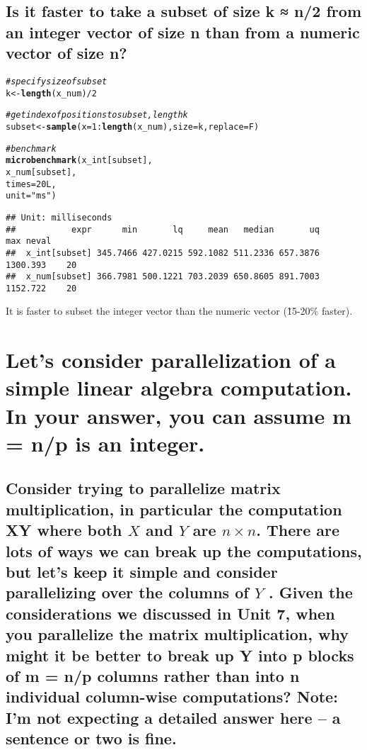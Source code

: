 \documentclass{article}\usepackage[]{graphicx}\usepackage[]{color}
\makeatletter
\newcommand{\hlnum}[1]{\textcolor[rgb]{0.686,0.059,0.569}{#1}}%
\newcommand{\hlstr}[1]{\textcolor[rgb]{0.192,0.494,0.8}{#1}}%
\newcommand{\hlcom}[1]{\textcolor[rgb]{0.678,0.584,0.686}{\textit{#1}}}%
\newcommand{\hlopt}[1]{\textcolor[rgb]{0,0,0}{#1}}%
\newcommand{\hlstd}[1]{\textcolor[rgb]{0.345,0.345,0.345}{#1}}%
\newcommand{\hlkwb}[1]{\textcolor[rgb]{0.69,0.353,0.396}{#1}}%
\newcommand{\hlkwc}[1]{\textcolor[rgb]{0.333,0.667,0.333}{#1}}%
\newcommand{\hlkwd}[1]{\textcolor[rgb]{0.737,0.353,0.396}{\textbf{#1}}}%
\newenvironment{kframe}{%
 \def\at@end@of@kframe{}%
 \ifinner\ifhmode%
  \def\at@end@of@kframe{\end{minipage}}%
  \begin{minipage}{\columnwidth}%
 \fi\fi%
 \def\FrameCommand##1{\hskip\@totalleftmargin \hskip-\fboxsep
 \colorbox{shadecolor}{##1}\hskip-\fboxsep
     \hskip-\linewidth \hskip-\@totalleftmargin \hskip\columnwidth}%
 \MakeFramed {\advance\hsize-\width
   \@totalleftmargin\z@ \linewidth\hsize
   \@setminipage}}%
 {\par\unskip\endMakeFramed%
 \at@end@of@kframe}
\newenvironment{knitrout}{}{} %
\makeatother
\begin{document}
\subsection{Is it faster to take a subset of size k ≈ n/2 from an integer vector of size n than from a numeric vector of size n?}

\begin{knitrout}
\color{fgcolor}\begin{kframe}
\begin{alltt}
\hlcom{#specify size of subset}
\hlstd{k} \hlkwb{<-} \hlkwd{length}\hlstd{(x_num)}\hlopt{/}\hlnum{2}

\hlcom{#get index of positions to subset, length k}
\hlstd{subset} \hlkwb{<-} \hlkwd{sample}\hlstd{(}\hlkwc{x} \hlstd{=} \hlnum{1}\hlopt{:}\hlkwd{length}\hlstd{(x_num),} \hlkwc{size} \hlstd{= k,} \hlkwc{replace} \hlstd{= F)}

\hlcom{#benchmark}
\hlkwd{microbenchmark}\hlstd{(x_int[subset],}
               \hlstd{x_num[subset],}
               \hlkwc{times} \hlstd{=} \hlnum{20L}\hlstd{,}
               \hlkwc{unit} \hlstd{=} \hlstr{"ms"}\hlstd{)}
\end{alltt}
\begin{verbatim}
## Unit: milliseconds
##           expr      min       lq     mean   median       uq      max neval
##  x_int[subset] 345.7466 427.0215 592.1082 511.2336 657.3876 1300.393    20
##  x_num[subset] 366.7981 500.1221 703.2039 650.8605 891.7003 1152.722    20
\end{verbatim}
\end{kframe}
\end{knitrout}

It is faster to subset the integer vector than the numeric vector (\~15-20\% faster). 

\section{Let’s consider parallelization of a simple linear algebra computation. In your answer, you can assume m = n/p is an integer.} %

\subsection{Consider trying to parallelize matrix multiplication, in particular the computation XY where both $X$ and $Y$ are $n \times n$. There are lots of ways we can break up the computations, but let’s keep it simple and consider parallelizing over the columns of $Y$ . Given the considerations we discussed in Unit 7, when you parallelize the matrix multiplication, why might it be better to break up Y into p blocks of m = n/p columns rather than into n individual column-wise computations? Note: I’m not expecting a detailed answer here – a sentence or two is fine.}
\end{document}
